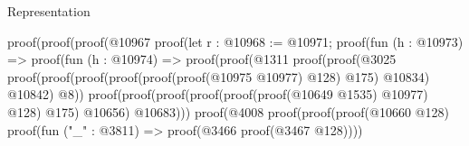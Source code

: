\begin{lexlean}{Representation}
\begin{coremodule}
                                                      proof(proof(proof(@10967
                                                              proof(let r : @10968 := @10971;
                                                                proof(fun (h : @10973) =>
                                                                  proof(fun (h : @10974) =>
                                                                    proof(proof(@1311
                                                                          proof(proof(@3025
                                                                                proof(proof(proof(proof(proof(proof(@10975
                                                                                              @10977)
                                                                                            @128)
                                                                                          @175)
                                                                                        @10834)
                                                                                      @10842)
                                                                                    @8))
                                                                              proof(proof(proof(proof(proof(proof(@10649
                                                                                            @1535)
                                                                                          @10977)
                                                                                        @128)
                                                                                      @175)
                                                                                    @10656)
                                                                                  @10683)))
                                                                        proof(@4008
                                                                            proof(proof(proof(@10660
                                                                                    @128)
                                                                                  proof(fun ("_" : @3811) =>
                                                                                    proof(@3466
                                                                                        proof(@3467
                                                                                            @128))))

\end{coremodule}
\end{lexlean}
